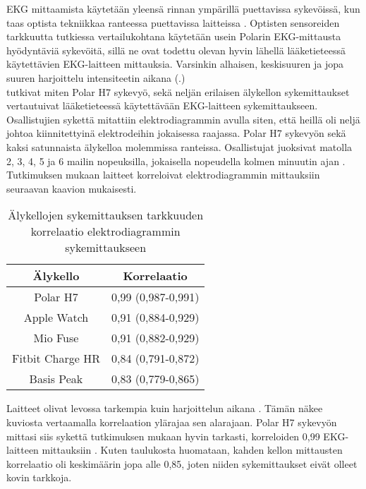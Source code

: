 \documentclass[utf8,bachelor,finnish]{bachelor}
\begin{document}
      
  EKG mittaamista käytetään yleensä rinnan ympärillä puettavissa sykevöissä, kun taas optista tekniikkaa ranteessa puettavissa laitteissa \parencite{noauthor_heart_nodate}.
   Optisten sensoreiden tarkkuutta tutkiessa vertailukohtana käytetään usein Polarin EKG-mittausta hyödyntäviä sykevöitä, sillä ne ovat todettu olevan hyvin lähellä
    lääketieteessä käytettävien EKG-laitteen mittauksia. Varsinkin alhaisen, keskisuuren ja jopa suuren harjoittelu intensiteetin aikana
     (\cite{gilgen-ammann_rr_2019, nelson_accuracy_2019}.) \\


   \textcite{wang_accuracy_2017} tutkivat miten Polar H7 sykevyö, sekä neljän erilaisen älykellon sykemittaukset vertautuivat lääketieteessä käytettävään
    EKG-laitteen sykemittaukseen. Osallistujien sykettä mitattiin elektrodiagrammin avulla siten,
     että heillä oli neljä johtoa kiinnitettyinä elektrodeihin jokaisessa raajassa. Polar H7 sykevyön sekä kaksi satunnaista älykelloa molemmissa ranteissa.
      Osallistujat juoksivat matolla 2, 3, 4, 5 ja 6 mailin nopeuksilla, jokaisella nopeudella kolmen minuutin ajan \parencite{wang_accuracy_2017}.
       Tutkimuksen mukaan laitteet korreloivat elektrodiagrammin mittauksiin seuraavan kaavion mukaisesti.\\


  \begin{table}[H]
    \begin{center}
      \begin{tabular}{||c c||} 
       \hline
       Älykello & Korrelaatio\\
       \hline\hline
       Polar H7 & 0,99 (0,987-0,991)\\
       \hline
      Apple Watch & 0,91 (0,884-0,929)\\
      \hline
      Mio Fuse & 0,91 (0,882-0,929)\\
      \hline
      Fitbit Charge HR & 0,84 (0,791-0,872)\\
      \hline
      Basis Peak & 0,83 (0,779-0,865)\\[0.5ex]
      \hline
      \end{tabular}
    \caption{Älykellojen sykemittauksen tarkkuuden korrelaatio elektrodiagrammin sykemittaukseen \parencite{wang_accuracy_2017}}
      \end{center}
    \end{table}

  Laitteet olivat levossa tarkempia kuin harjoittelun aikana \parencite{wang_accuracy_2017}. Tämän näkee kuviosta vertaamalla korrelaation ylärajaa sen alarajaan.
   Polar H7 sykevyön mittasi siis sykettä tutkimuksen mukaan hyvin tarkasti, korreloiden 0,99 EKG-laitteen mittauksiin \parencite{wang_accuracy_2017}.
    Kuten taulukosta huomataan, kahden kellon mittausten korrelaatio oli keskimäärin jopa alle 0,85, joten niiden sykemittaukset eivät olleet kovin tarkkoja.\\
  
\end{document}
